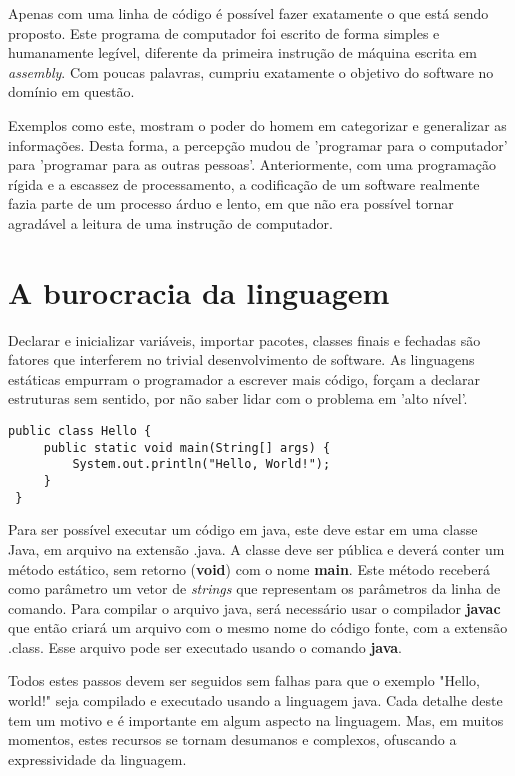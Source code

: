 \documentclass[espaco=simples,appendix=Name]{abnt}
\begin{document}
Apenas com uma linha de código é possível fazer exatamente o que está sendo proposto. Este programa de computador foi escrito de forma simples e humanamente legível, diferente da primeira instrução de máquina escrita em \textit{assembly}. Com poucas palavras, cumpriu exatamente o objetivo do software no domínio em questão.

Exemplos como este, mostram o poder do homem em categorizar e generalizar as informações. Desta forma, a percepção mudou de 'programar para o computador' para 'programar para as outras pessoas'. Anteriormente, com uma programação rígida e a escassez de processamento, a codificação de um software realmente fazia parte de um processo árduo e lento, em que não era possível tornar agradável a leitura de uma instrução de computador.

\section { A burocracia da linguagem }

Declarar e inicializar variáveis, importar pacotes, classes finais e fechadas são fatores que interferem no trivial desenvolvimento de software. As linguagens estáticas empurram o programador a escrever mais código, forçam a declarar estruturas sem sentido, por não saber lidar com o problema em 'alto nível'.

\begin{lstlisting}[label=HelloWorldJava, caption=Programa Hello World em Java]
 public class Hello {
     public static void main(String[] args) {
         System.out.println("Hello, World!");
     }
 }
\end{lstlisting}

Para ser possível executar um código em java, este deve estar em uma classe Java, em arquivo na extensão .java. A classe deve ser pública e deverá conter um método estático, sem retorno (\textbf{void}) com o nome \textbf{main}. Este método receberá como parâmetro um vetor de \textit{strings} que representam os parâmetros da linha de comando. Para compilar o arquivo java, será necessário usar o compilador \textbf{javac} que então criará um arquivo com o mesmo nome do código fonte, com a extensão .class. Esse arquivo pode ser executado usando o comando \textbf{java}. 

Todos estes passos devem ser seguidos sem falhas para que o exemplo "Hello, world!" seja compilado e executado usando a linguagem java. Cada detalhe deste tem um motivo e é importante em algum aspecto na linguagem. Mas, em muitos momentos, estes recursos se tornam desumanos e complexos, ofuscando a expressividade da linguagem.
\end{document}
